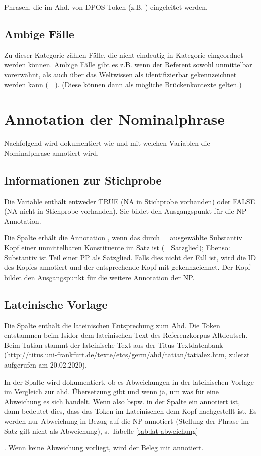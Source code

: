 {\noindent 
{} Phrasen, die im Ahd. von DPOS-Token (z.B. ) eingeleitet werden.

\subsection{Ambige Fälle}

Zu dieser Kategorie zählen Fälle, die nicht eindeutig in  Kategorie eingeordnet werden können. Ambige Fälle gibt es z.B. wenn der Referent sowohl unmittelbar vorerwähnt, als auch über das Weltwissen als identifizierbar gekennzeichnet werden kann (=\,). (Diese können dann als mögliche Brückenkontexte gelten.)

\section{Annotation der Nominalphrase}\label{sec:richtlinien-np}

Nachfolgend wird dokumentiert wie und mit welchen Variablen die Nominalphrase annotiert wird. 

\subsection{Informationen zur Stichprobe}

Die Variable  enthält entweder TRUE (NA in Stichprobe vorhanden) oder FALSE (NA nicht in Stichprobe vorhanden). Sie bildet den Ausgangspunkt für die NP-Annotation.

Die Spalte  erhält die Annotation , wenn das durch  =  ausgewählte Substantiv Kopf einer unmittelbaren Konstituente im Satz ist (=\,Satzglied); Ebenso: Substantiv ist Teil einer PP als Satzglied. Falls dies nicht der Fall ist, wird die ID des Kopfes annotiert und der entsprechende Kopf mit  gekennzeichnet. Der Kopf bildet den Ausgangspunkt für die weitere Annotation der NP. 


\subsection{Lateinische Vorlage}

Die Spalte  enthält die lateinischen Entsprechung zum Ahd.
Die Token entstammen beim Isidor dem lateinischen Text des Referenzkorpus Altdeutsch. Beim Tatian stammt der lateinische Text aus der Titus-Textdatenbank (\url{http://titus.uni-frankfurt.de/texte/etcs/germ/ahd/tatian/tatialex.htm}, zuletzt aufgerufen am 20.02.2020). 

In der Spalte  wird dokumentiert, ob es Abweichungen in der lateinischen Vorlage im Vergleich zur ahd. Übersetzung gibt und wenn ja, um was für eine Abweichung es sich handelt. Wenn also bspw. in der Spalte ein  annotiert ist, dann bedeutet dies, dass das Token im Lateinischen dem Kopf nachgestellt ist. Es werden nur Abweichung in Bezug auf die NP annotiert (Stellung der Phrase im Satz gilt nicht als Abweichung), s. Tabelle \ref{tab:lat-abweichung}}. Wenn keine Abweichung vorliegt, wird der Beleg mit  annotiert. 


